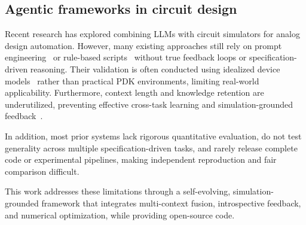 \subsection{Agentic frameworks in circuit design}

Recent research has explored combining LLMs with circuit simulators for analog design automation. However, many existing approaches still rely on prompt engineering~\cite{vungarala2024spicepilot} or rule-based scripts~\cite{zhang2025analogxpert} without true feedback loops or specification-driven reasoning. Their validation is often conducted using idealized device models~\cite{chen2025menter} rather than practical PDK environments, limiting real-world applicability. Furthermore, context length and knowledge retention are underutilized, preventing effective cross-task learning and simulation-grounded feedback~\cite{lai2025analogcoder,chen2024artisan}. 

In addition, most prior systems lack rigorous quantitative evaluation, do not test generality across multiple specification-driven tasks, and rarely release complete code or experimental pipelines, making independent reproduction and fair comparison difficult.

This work addresses these limitations through a self-evolving, simulation-grounded framework that integrates multi-context fusion, introspective feedback, and numerical optimization, while providing open-source code.